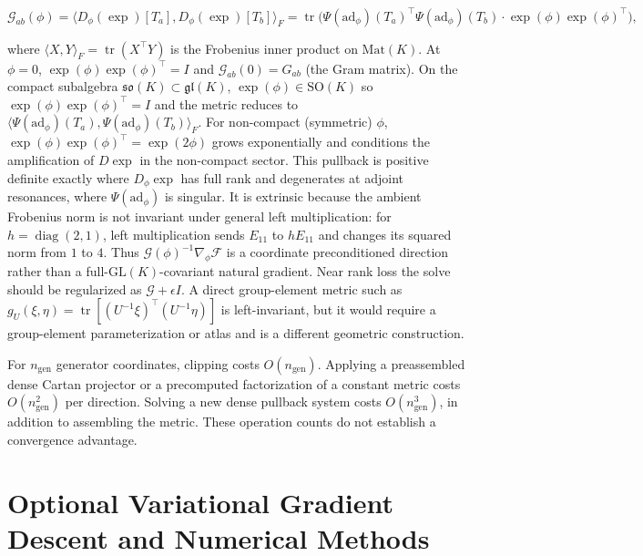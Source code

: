 \documentclass[twoside,11pt]{article}
\begin{document}
\begin{equation}
\mathcal{G}_{ab}(\phi)
=\langle D_\phi(\exp)[T_a], D_\phi(\exp)[T_b]\rangle_F
= \operatorname{tr}\bigl(\Psi(\mathrm{ad}_\phi)(T_a)^\top \Psi(\mathrm{ad}_\phi)(T_b) \cdot \exp(\phi)\exp(\phi)^\top\bigr),
\label{eq:pullback_metric}
\end{equation}

where $\langle X, Y \rangle_F = \operatorname{tr}(X^\top Y)$ is the Frobenius inner product on $\mathrm{Mat}(K)$. At $\phi = 0$, $\exp(\phi)\exp(\phi)^\top = I$ and $\mathcal{G}_{ab}(0) = G_{ab}$ (the Gram matrix). On the compact subalgebra $\mathfrak{so}(K) \subset \mathfrak{gl}(K)$, $\exp(\phi) \in \mathrm{SO}(K)$ so $\exp(\phi)\exp(\phi)^\top = I$ and the metric reduces to $\langle \Psi(\mathrm{ad}_\phi)(T_a), \Psi(\mathrm{ad}_\phi)(T_b)\rangle_F$. For non-compact (symmetric) $\phi$, $\exp(\phi)\exp(\phi)^\top = \exp(2\phi)$ grows exponentially and conditions the amplification of $D\exp$ in the non-compact sector. This pullback is positive definite exactly where $D_\phi\exp$ has full rank and degenerates at adjoint resonances, where $\Psi(\mathrm{ad}_\phi)$ is singular. It is extrinsic because the ambient Frobenius norm is not invariant under general left multiplication: for $h=\operatorname{diag}(2,1)$, left multiplication sends $E_{11}$ to $hE_{11}$ and changes its squared norm from $1$ to $4$. Thus $\mathcal{G}(\phi)^{-1}\nabla_\phi\mathcal{F}$ is a coordinate preconditioned direction rather than a full-$\mathrm{GL}(K)$-covariant natural gradient. Near rank loss the solve should be regularized as $\mathcal{G} + \epsilon I$. A direct group-element metric such as $g_U(\xi,\eta)=\operatorname{tr}[(U^{-1}\xi)^\top(U^{-1}\eta)]$ is left-invariant, but it would require a group-element parameterization or atlas and is a different geometric construction.

For $n_{\mathrm{gen}}$ generator coordinates, clipping costs $O(n_{\mathrm{gen}})$. Applying a preassembled dense Cartan projector or a precomputed factorization of a constant metric costs $O(n_{\mathrm{gen}}^2)$ per direction. Solving a new dense pullback system costs $O(n_{\mathrm{gen}}^3)$, in addition to assembling the metric. These operation counts do not establish a convergence advantage.


\section{Optional Variational Gradient Descent and Numerical Methods}
\label{app:variational_descent}
\end{document}
